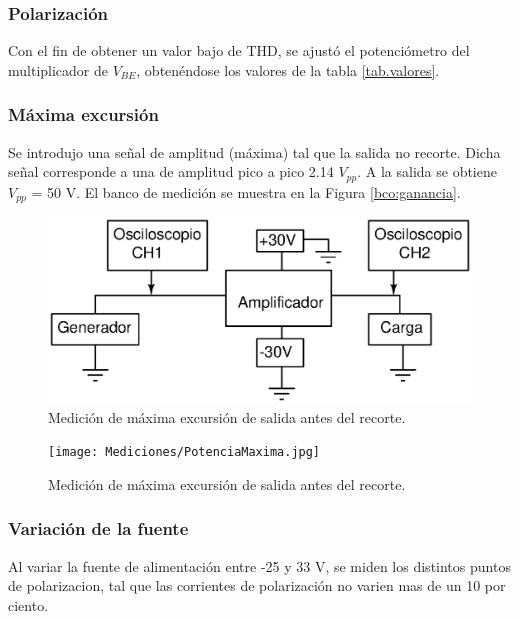 

		\subsubsection{Polarización}
			Con el fin de obtener un valor bajo de THD, se ajustó el potenciómetro del multiplicador de $V_{BE}$, obtenéndose los valores de la tabla \ref{tab.valores}.

		\subsubsection{Máxima excursión}
		Se introdujo una señal de amplitud (máxima) tal que la salida no recorte. Dicha señal corresponde a una
		de amplitud pico a pico 2.14 $V_{pp}$. A la salida se obtiene $V_{pp}$ = 50 V. El banco de medición se muestra en la Figura \ref{bco:ganancia}.

		\begin{figure}[h!]
			\centering
			\includegraphics[scale=0.5]{Figuras/bco_ganancia.eps}
			\caption{Medición de máxima excursión de salida antes del recorte.}
			\label{fig:bco_ganancia}
		\end{figure}

		\begin{figure}[h!]
			\centering
			\texttt{[image: Mediciones/PotenciaMaxima.jpg]}
			\caption{Medición de máxima excursión de salida antes del recorte.}
			\label{fig:MaxExcur}
		\end{figure}

		\subsubsection{Variación de la fuente}
		Al variar la fuente de alimentación entre -25 y 33 V, se miden los distintos puntos de polarizacion, tal que las corrientes de polarización no varien mas de un 10 por ciento.
		
